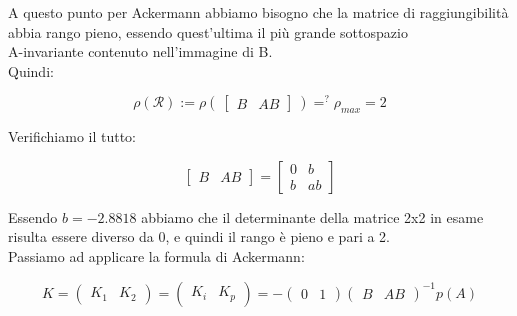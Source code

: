 \documentclass[a4paper,13pt]{article}
\begin{document}
	A questo punto per Ackermann abbiamo bisogno che la matrice di raggiungibilità abbia rango pieno, essendo quest'ultima 	il più grande sottospazio \\A-invariante contenuto nell'immagine di B.\\
	Quindi:
	
\begin{equation*}
	\rho(\mathcal{R}):=
\rho(\:\begin{bmatrix}

	B&AB

\end{bmatrix}\:)=^{?}\rho_{max}=2
\end{equation*}

	Verifichiamo il tutto:
	
\begin{equation*}
\begin{bmatrix}

	B&AB

\end{bmatrix} =              %
\begin{bmatrix}

	0&b\\b&ab

\end{bmatrix}
\end{equation*}

	Essendo $b=-2.8818$ abbiamo che il determinante della matrice  2x2 in esame risulta essere diverso da 0,
	e quindi il rango è pieno e pari a 2.\\
	Passiamo ad applicare la formula di Ackermann:
	
\begin{equation*}                    %
	K=
\begin{pmatrix}

	K_{1}&K_{2}

\end{pmatrix} =						%
\begin{pmatrix}

	K_{i}&K_{p}						

\end{pmatrix} = -					%
\begin{pmatrix}

	0&1						

\end{pmatrix}
\begin{pmatrix}

	B&AB					

\end{pmatrix}^{-1}p(A)
\end{equation*}
\end{document}
